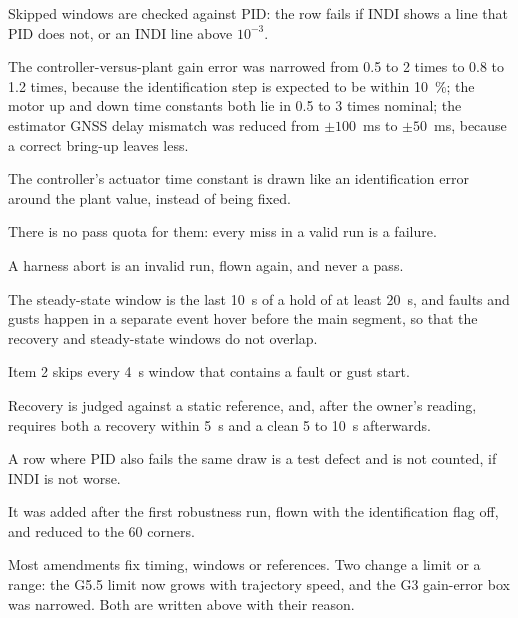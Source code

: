 \begin{description}[leftmargin=1.4em,labelindent=0pt]
  \item[G4 guard] Skipped windows are checked against PID: the row fails if INDI shows a line that PID does not, or an INDI line above $10^{-3}$.
  \item[G3 factors] The controller-versus-plant gain error was narrowed from 0.5 to 2 times to 0.8 to 1.2 times, because the identification step is expected to be within 10~\%; the motor up and down time constants both lie in 0.5 to 3 times nominal; the estimator GNSS delay mismatch was reduced from $\pm 100$~ms to $\pm 50$~ms, because a correct bring-up leaves less.
  \item[G3 controller time constant] The controller's actuator time constant is drawn like an identification error around the plant value, instead of being fixed.
  \item[G3 items 3 to 6] There is no pass quota for them: every miss in a valid run is a failure.
  \item[G3 harness aborts] A harness abort is an invalid run, flown again, and never a pass.
  \item[G3 steady state, events] The steady-state window is the last 10~s of a hold of at least 20~s, and faults and gusts happen in a separate event hover before the main segment, so that the recovery and steady-state windows do not overlap.
  \item[G3 oscillation windows] Item 2 skips every 4~s window that contains a fault or gust start.
  \item[G3 item 5] Recovery is judged against a static reference, and, after the owner's reading, requires both a recovery within 5~s and a clean 5 to 10~s afterwards.
  \item[G3 item 4] A row where PID also fails the same draw is a test defect and is not counted, if INDI is not worse.
  \item[G6 item 7] It was added after the first robustness run, flown with the identification flag off, and reduced to the 60 corners.
\end{description}

Most amendments fix timing, windows or references.
Two change a limit or a range: the G5.5 limit now grows with trajectory speed, and the G3 gain-error box was narrowed.
Both are written above with their reason.
